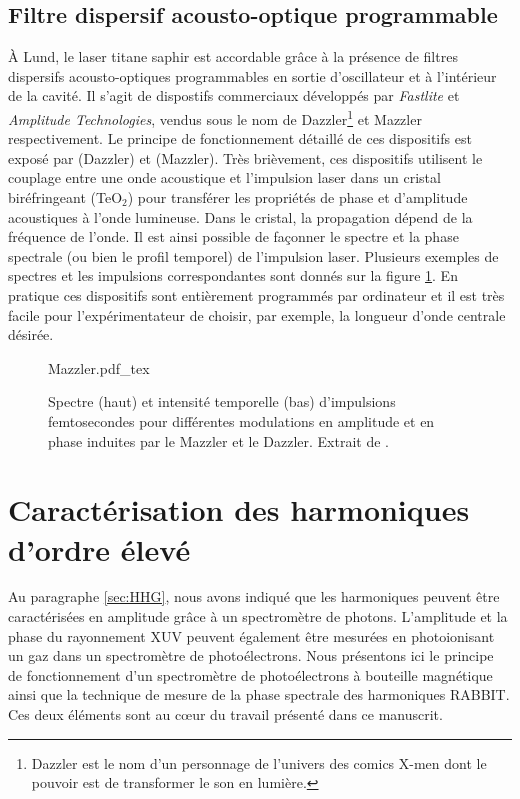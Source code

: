 \subsection{Filtre dispersif acousto-optique programmable}
\`{A} Lund, le laser titane saphir est accordable grâce à la présence de filtres dispersifs acousto-optiques programmables en sortie d'oscillateur et à l'intérieur de la cavité. Il s'agit de dispostifs commerciaux développés par \textit{Fastlite} et \textit{Amplitude Technologies}, vendus sous le nom de Dazzler\footnote{Dazzler est le nom d'un personnage de l'univers des comics X-men dont le pouvoir est de transformer le son en lumière.} et Mazzler respectivement. Le principe de fonctionnement détaillé de ces dispositifs est exposé par  (Dazzler) et
 (Mazzler). Très brièvement, ces dispositifs utilisent le couplage entre une onde acoustique et l'impulsion laser dans un cristal biréfringeant (TeO$_2$) pour transférer les propriétés de phase et d'amplitude acoustiques à l'onde lumineuse. Dans le cristal, la propagation dépend de la fréquence de l'onde. Il est ainsi possible de façonner le spectre et la phase spectrale (ou bien le profil temporel) de l'impulsion laser. Plusieurs exemples de spectres et les impulsions correspondantes sont donnés sur la figure \ref{fig:Mazzler}. En pratique ces dispositifs sont entièrement programmés par ordinateur et il est très facile pour l'expérimentateur de choisir, par exemple, la longueur d'onde centrale désirée.

\begin{figure}
\centering
\def\svgwidth{0.5\columnwidth}
{Mazzler.pdf_tex}
\caption{Spectre (haut) et intensité temporelle (bas) d'impulsions femtosecondes pour différentes modulations en amplitude et en phase induites par le Mazzler et le Dazzler. Extrait de .}
\label{fig:Mazzler}
\end{figure}


\section{Caractérisation des harmoniques d'ordre élevé}
\label{sec:CaracHHG}
Au paragraphe \ref{sec:HHG}, nous avons indiqué que les harmoniques peuvent être caractérisées en amplitude grâce à un spectromètre de photons. L'amplitude et la phase du rayonnement XUV peuvent également être mesurées en photoionisant un gaz dans un spectromètre de photoélectrons. Nous présentons ici le principe de fonctionnement d'un spectromètre de photoélectrons à bouteille magnétique ainsi que la technique de mesure de la phase spectrale des harmoniques RABBIT. Ces deux éléments sont au c\oe ur du travail présenté dans ce manuscrit.

